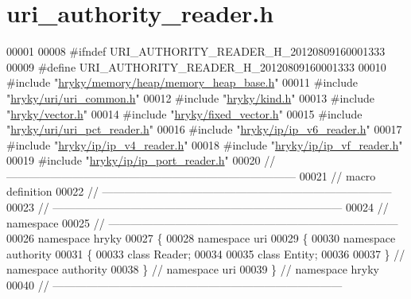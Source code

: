 \hypertarget{uri__authority__reader_8h_source}{\section{uri\-\_\-authority\-\_\-reader.\-h}
}

\begin{DoxyCode}
00001 
00008 \textcolor{preprocessor}{#ifndef URI\_AUTHORITY\_READER\_H\_20120809160001333}
00009 \textcolor{preprocessor}{}\textcolor{preprocessor}{#define URI\_AUTHORITY\_READER\_H\_20120809160001333}
00010 \textcolor{preprocessor}{}\textcolor{preprocessor}{#include "\hyperlink{memory__heap__base_8h}{hryky/memory/heap/memory_heap_base.h}"}
00011 \textcolor{preprocessor}{#include "\hyperlink{uri__common_8h}{hryky/uri/uri_common.h}"}
00012 \textcolor{preprocessor}{#include "\hyperlink{kind_8h}{hryky/kind.h}"}
00013 \textcolor{preprocessor}{#include "\hyperlink{vector_8h}{hryky/vector.h}"}
00014 \textcolor{preprocessor}{#include "\hyperlink{fixed__vector_8h}{hryky/fixed_vector.h}"}
00015 \textcolor{preprocessor}{#include "\hyperlink{uri__pct__reader_8h}{hryky/uri/uri_pct_reader.h}"}
00016 \textcolor{preprocessor}{#include "\hyperlink{ip__v6__reader_8h}{hryky/ip/ip_v6_reader.h}"}
00017 \textcolor{preprocessor}{#include "\hyperlink{ip__v4__reader_8h}{hryky/ip/ip_v4_reader.h}"}
00018 \textcolor{preprocessor}{#include "\hyperlink{ip__vf__reader_8h}{hryky/ip/ip_vf_reader.h}"}
00019 \textcolor{preprocessor}{#include "\hyperlink{ip__port__reader_8h}{hryky/ip/ip_port_reader.h}"}
00020 \textcolor{comment}{//
      ------------------------------------------------------------------------------}
00021 \textcolor{comment}{// macro definition}
00022 \textcolor{comment}{//
      ------------------------------------------------------------------------------}
00023 \textcolor{comment}{//
      ------------------------------------------------------------------------------}
00024 \textcolor{comment}{// namespace}
00025 \textcolor{comment}{//
      ------------------------------------------------------------------------------}
00026 \textcolor{keyword}{namespace }hryky
00027 \{
00028 \textcolor{keyword}{namespace }uri
00029 \{
00030 \textcolor{keyword}{namespace }authority
00031 \{
00033     \textcolor{keyword}{class }Reader;
00034 
00035     \textcolor{keyword}{class }Entity;
00036 
00037 \} \textcolor{comment}{// namespace authority}
00038 \} \textcolor{comment}{// namespace uri}
00039 \} \textcolor{comment}{// namespace hryky}
00040 \textcolor{comment}{//
      ------------------------------------------------------------------------------}

\end{DoxyCode}
